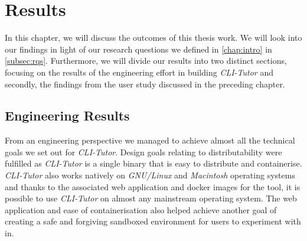 \chapter{Results}
\label{chap:results}


%
                                                                                         
                                                                                         
                                                                                         


In this chapter, we will discuss the outcomes of this thesis work. We will look
into our findings in light of our research questions we defined in
\autoref{chap:intro} in \autoref{subsec:rqs}. Furthermore, we will divide our
results into two distinct sections, focusing on the results of the engineering
effort in building \textit{CLI-Tutor} and secondly, the findings from the user
study discussed in the preceding chapter.


\section{Engineering Results}

From an engineering perspective we managed to achieve almost all the
technical goals we set out for \textit{CLI-Tutor}. Design goals relating to
distributability were fulfilled as \textit{CLI-Tutor} is a single binary that
is easy to distribute and containerise. \textit{CLI-Tutor} also works natively
on  \textit{GNU/Linux} and  \textit{Macintosh} operating systems and thanks to
the associated web application and docker images for the tool, it is possible
to use \textit{CLI-Tutor} on almost any mainstream operating system. The web
application and ease of containerisation also helped achieve another goal of
creating a safe and forgiving sandboxed environment for users to experiment
with in.

